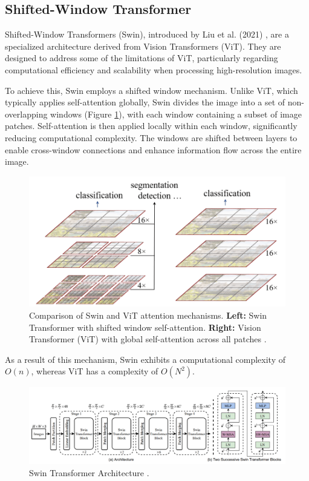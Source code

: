 \documentclass[a4paper,10pt]{book}
\begin{document}
\subsection{Shifted-Window Transformer}

Shifted-Window Transformers (Swin), introduced by Liu et al. (2021) \cite{liu_swin_2021}, are a specialized architecture derived from Vision Transformers (ViT). They are designed to address some of the limitations of ViT, particularly regarding computational efficiency and scalability when processing high-resolution images.

To achieve this, Swin employs a shifted window mechanism. Unlike ViT, which typically applies self-attention globally, Swin divides the image into a set of non-overlapping windows (Figure \ref{fig:swin_vit}), with each window containing a subset of image patches. Self-attention is then applied locally within each window, significantly reducing computational complexity. The windows are shifted between layers to enable cross-window connections and enhance information flow across the entire image.

\begin{figure}[h!]
    \centering
    \includegraphics[width=0.6\linewidth]{reports//assets/Swin.png}
    \caption[Comparison of Swin and ViT mechanisms]{Comparison of Swin and ViT attention mechanisms. \textbf{Left:} Swin Transformer with shifted window self-attention. \textbf{Right:} Vision Transformer (ViT) with global self-attention across all patches \cite{liu_swin_2021}.}
    \label{fig:swin_vit}
\end{figure}

As a result of this mechanism, Swin exhibits a computational complexity of $O(n)$, whereas ViT has a complexity of $O(N^2)$. 



\begin{figure}[h!]
    \centering
    \includegraphics[width=1.0\linewidth]{reports//assets/SwinArch.png}
    \caption[Swin Transformer Arch]{Swin Transformer Architecture \cite{liu_swin_2021}.}
    \label{fig:swin_arch}
\end{figure}
\end{document}
